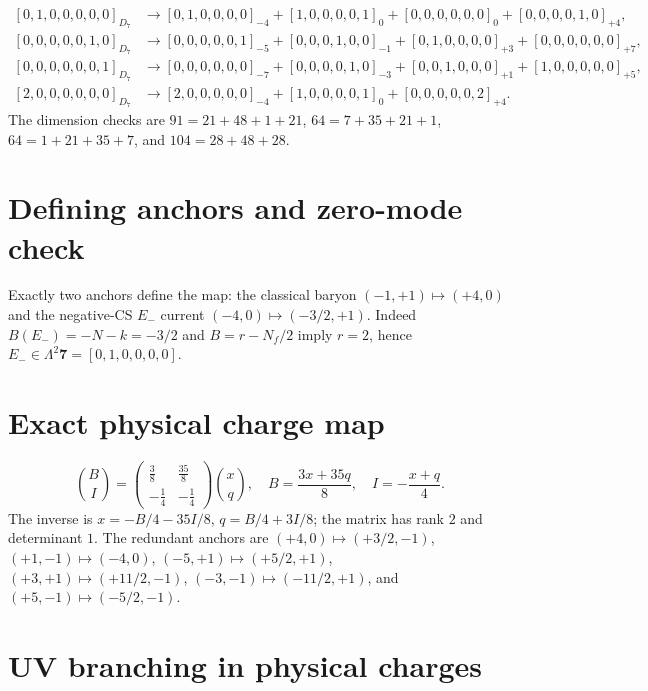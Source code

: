 \documentclass{article}
\begin{document}
\[
\begin{aligned}
[0,1,0,0,0,0,0]_{D_7}&\to[0,1,0,0,0,0]_{-4}+[1,0,0,0,0,1]_0+[0,0,0,0,0,0]_0+[0,0,0,0,1,0]_{+4},\\
[0,0,0,0,0,1,0]_{D_7}&\to[0,0,0,0,0,1]_{-5}+[0,0,0,1,0,0]_{-1}+[0,1,0,0,0,0]_{+3}+[0,0,0,0,0,0]_{+7},\\
[0,0,0,0,0,0,1]_{D_7}&\to[0,0,0,0,0,0]_{-7}+[0,0,0,0,1,0]_{-3}+[0,0,1,0,0,0]_{+1}+[1,0,0,0,0,0]_{+5},\\
[2,0,0,0,0,0,0]_{D_7}&\to[2,0,0,0,0,0]_{-4}+[1,0,0,0,0,1]_0+[0,0,0,0,0,2]_{+4}.
\end{aligned}
\]
The dimension checks are $91=21+48+1+21$, $64=7+35+21+1$, $64=1+21+35+7$, and $104=28+48+28$.
\section{Defining anchors and zero-mode check}
Exactly two anchors define the map: the classical baryon $(-1,+1)\mapsto(+4,0)$ and the negative-CS $E_-$ current $(-4,0)\mapsto(-3/2,+1)$.  Indeed $B(E_-)=-N-k=-3/2$ and $B=r-N_f/2$ imply $r=2$, hence $E_-\in\Lambda^2\mathbf7=[0,1,0,0,0,0]$.
\section{Exact physical charge map}
\[
\binom BI=\begin{pmatrix}\frac38&\frac{35}{8}\\-\frac14&-\frac14\end{pmatrix}\binom xq,
\quad B=\frac{3x+35q}{8},\quad I=-\frac{x+q}{4}.
\]
The inverse is $x=-B/4-35I/8$, $q=B/4+3I/8$; the matrix has rank $2$ and determinant $1$.
The redundant anchors are $(+4,0)\mapsto(+3/2,-1)$, $(+1,-1)\mapsto(-4,0)$, $(-5,+1)\mapsto(+5/2,+1)$, $(+3,+1)\mapsto(+11/2,-1)$, $(-3,-1)\mapsto(-11/2,+1)$, and $(+5,-1)\mapsto(-5/2,-1)$.

\section{UV branching in physical charges}
\end{document}
